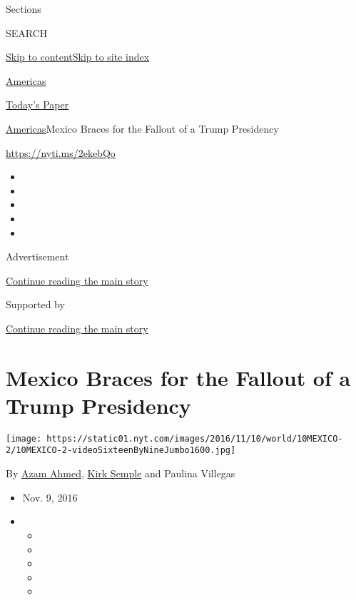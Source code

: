 Sections

SEARCH

\protect\hyperlink{site-content}{Skip to
content}\protect\hyperlink{site-index}{Skip to site index}

\href{https://www.nytimes.com/section/world/americas}{Americas}

\href{https://myaccount.nytimes.com/auth/login?response_type=cookie\&client_id=vi}{}

\href{https://www.nytimes.com/section/todayspaper}{Today's Paper}

\href{/section/world/americas}{Americas}\textbar{}Mexico Braces for the
Fallout of a Trump Presidency

\url{https://nyti.ms/2ekebQo}

\begin{itemize}
\item
\item
\item
\item
\item
\end{itemize}

Advertisement

\protect\hyperlink{after-top}{Continue reading the main story}

Supported by

\protect\hyperlink{after-sponsor}{Continue reading the main story}

\hypertarget{mexico-braces-for-the-fallout-of-a-trump-presidency}{%
\section{Mexico Braces for the Fallout of a Trump
Presidency}\label{mexico-braces-for-the-fallout-of-a-trump-presidency}}

\texttt{[image: https://static01.nyt.com/images/2016/11/10/world/10MEXICO-2/10MEXICO-2-videoSixteenByNineJumbo1600.jpg]}

By \href{http://www.nytimes.com/by/azam-ahmed}{Azam Ahmed},
\href{http://www.nytimes.com/by/kirk-semple}{Kirk Semple} and Paulina
Villegas

\begin{itemize}
\item
  Nov. 9, 2016
\item
  \begin{itemize}
  \item
  \item
  \item
  \item
  \item
  \end{itemize}
\end{itemize}

